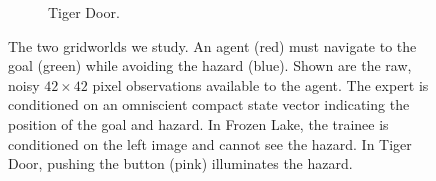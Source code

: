 \begin{figure}[t!]
\begin{subfigure}[t]{0.23\textwidth}
        \caption{Tiger Door.}
        \label{fig:gridworld_asym:TigerDoor:im}
    \end{subfigure}
    \caption{The two gridworlds we study.  An agent (red) must navigate to the goal (green) while avoiding the hazard (blue).  Shown are the raw, noisy $42\times 42$ pixel observations available to the agent.  The expert is conditioned on an omniscient compact state vector indicating the position of the goal and hazard.  In Frozen Lake, the trainee is conditioned on the left image and cannot see the hazard.  In Tiger Door, pushing the button (pink) illuminates the hazard.  } 
    \label{fig:gridworld_asym:grids}
\end{figure}
